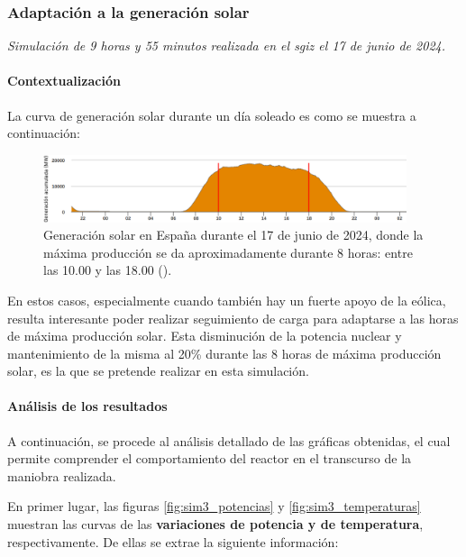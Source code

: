 \subsubsection{Adaptación a la generación solar}

\textit{Simulación de 9 horas y 55 minutos realizada en el \acrshort{sgiz} el 17 de junio de 2024.}

\paragraph{Contextualización}

La curva de generación solar durante un día soleado es como se muestra a continuación:

\begin{figure}[!h]
  \centering
  \includegraphics[width=0.95\textwidth]{content/figures/generacion_solar.png}
  \caption{Generación solar en España durante el 17 de junio de 2024, donde la máxima producción se da aproximadamente durante 8 horas: entre las 10.00 y las 18.00 (\cite{ree_demanda}).}
  \label{fig:generacion_solar}
\end{figure}

En estos casos, especialmente cuando también hay un fuerte apoyo de la eólica, resulta interesante poder realizar seguimiento de carga para adaptarse a las horas de máxima producción solar. Esta disminución de la potencia nuclear y mantenimiento de la misma al 20\% durante las 8 horas de máxima producción solar, es la que se pretende realizar en esta simulación.

\paragraph{Análisis de los resultados}

A continuación, se procede al análisis detallado de las gráficas obtenidas, el cual permite comprender el comportamiento del reactor en el transcurso de la maniobra realizada.

En primer lugar, las figuras \ref{fig:sim3_potencias} y \ref{fig:sim3_temperaturas} muestran las curvas de las \textbf{variaciones de potencia y de temperatura}, respectivamente. De ellas se extrae la siguiente información:

